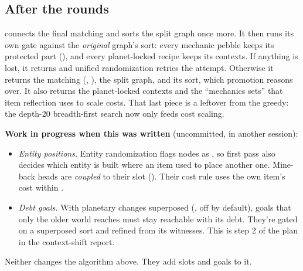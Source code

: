 \subsection{After the rounds}
\label{sec:after}

 connects the final matching and sorts the split graph once more. It then runs its own gate against the \emph{original} graph's sort: every mechanic pebble keeps its protected part (), and every planet-locked recipe keeps its contexts. If anything is lost, it returns  and unified randomization retries the attempt. Otherwise it returns the matching (, ), the split graph, and its sort, which promotion reasons over. It also returns the planet-locked contexts and the ``mechanics sets'' that item reflection uses to scale costs. That last piece is a leftover from the greedy: the depth-20 breadth-first search now only feeds cost scaling.

\begin{factbox}
\textbf{Work in progress when this was written} (uncommitted, in another session):
\begin{itemize}
  \item \emph{Entity positions.} Entity randomization flags  nodes as , so first pass also decides which entity is built where an item used to place another one. Mine-back heads are \emph{coupled} to their slot (). Their cost rule uses the own item's cost within .
  \item \emph{Debt goals.} With planetary changes superposed (, off by default), goals that only the older world reaches must stay reachable with its debt. They're gated on a superposed sort and refined from its witnesses. This is step 2 of the plan in the context-shift report.
\end{itemize}
Neither changes the algorithm above. They add slots and goals to it.
\end{factbox}
